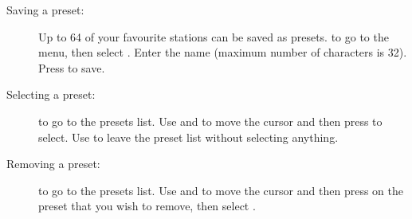   \begin{description}

  \item[Saving a preset:]
    Up to 64 of your favourite stations can be saved as presets.
      \ActionFMMenu{} to go to the menu, then select .%
    Enter the name (maximum number of characters is 32).
    Press \ActionKbdDone{} to save.

  \item[Selecting a preset:]
        \ActionFMPreset to go to the presets list.
        Use \ActionFMSettingsInc{} and \ActionFMSettingsDec{}
        to move the cursor and then press \ActionStdOk{}
        to select. Use \ActionStdCancel{} to leave the preset list without selecting
        anything.

  \item[Removing a preset:]
        \ActionFMPreset to go to the presets list.
        Use \ActionFMSettingsInc{} and \ActionFMSettingsDec{}
        to move the cursor and then press \ActionStdContext{}
        on the preset that you wish to remove, then select .
  \end{description}
